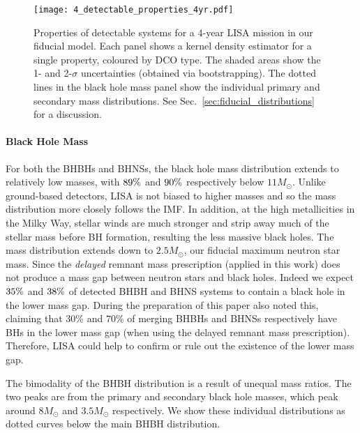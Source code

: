 \begin{figure*}[t]
    \centering
    \texttt{[image: 4\_detectable\_properties\_4yr.pdf]}
    \caption{Properties of detectable systems for a 4-year LISA mission in our fiducial model. Each panel shows a kernel density estimator for a single property, coloured by DCO type. The shaded areas show the 1- and 2-$\sigma$ uncertainties (obtained via bootstrapping). The dotted lines in the black hole mass panel show the individual primary and secondary mass distributions. See Sec.~\ref{sec:fiducial_distributions} for a discussion.}
    \label{fig:fiducial_pdf_distributions}
\end{figure*}

\paragraph{Black Hole Mass}
For both the BHBHs and BHNSs, the black hole mass distribution extends to relatively low masses, with $89\%{}$ and $90\%{}$ respectively below $11 \unit{M_{\odot}}$. Unlike ground-based detectors, LISA is not biased to higher masses and so the mass distribution more closely follows the IMF. In addition, at the high metallicities in the Milky Way, stellar winds are much stronger and strip away much of the stellar mass before BH formation, resulting the less massive black holes. The mass distribution extends down to $2.5 \unit{M_{\odot}}$, our fiducial maximum neutron star mass. Since the \citet{Fryer+2012} \textit{delayed} remnant mass prescription (applied in this work) does not produce a mass gap between neutron stars and black holes. Indeed we expect $35\%{}$ and $38\%{}$ of detected BHBH and BHNS systems to contain a black hole in the lower mass gap. During the preparation of this paper \citet{Shao+2021} also noted this, claiming that $30\%$ and $70\%$ of merging BHBHs and BHNSs respectively have BHs in the lower mass gap (when using the delayed remnant mass prescription). Therefore, LISA could help to confirm or rule out the existence of the lower mass gap.

The bimodality of the BHBH distribution is a result of unequal mass ratios. The two peaks are from the primary and secondary black hole masses, which peak around $8 \unit{M_{\odot}}$ and $3.5 \unit{M_{\odot}}$ respectively. We show these individual distributions as dotted curves below the main BHBH distribution.

